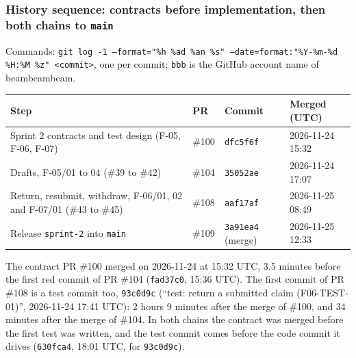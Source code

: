 \subsubsection*{History sequence: contracts before implementation, then both chains to \texttt{main}}

Commands: \texttt{git log -1 --format="\%h  \%ad  \%an  \%s" --date=format:"\%Y-\%m-\%d \%H:\%M \%z" <commit>}, one per commit; \texttt{bbb} is the GitHub account name of beambeambeam.


\begin{center}\small
\begin{tabular}{@{}p{7.2cm}lll@{}}
\toprule \textbf{Step} & \textbf{PR} & \textbf{Commit} & \textbf{Merged (UTC)} \\ \midrule
Sprint 2 contracts and test design (F-05, F-06, F-07) & \#100 & \texttt{dfc5f6f} & 2026-11-24 15:32 \\
Drafts, F-05/01 to 04 (\#39 to \#42) & \#104 & \texttt{35052ae} & 2026-11-24 17:07 \\
Return, resubmit, withdraw, F-06/01, 02 and F-07/01 (\#43 to \#45) & \#108 & \texttt{aaf17af} & 2026-11-25 08:49 \\
Release \texttt{sprint-2} into \texttt{main} & \#109 & \texttt{3a91ea4} (merge) & 2026-11-25 12:33 \\
\bottomrule
\end{tabular}
\end{center}

The contract PR \#100 merged on 2026-11-24 at 15:32 UTC, 3.5 minutes before the first red commit of PR \#104 (\texttt{fad37c0}, 15:36 UTC). The first commit of PR \#108 is a test commit too, \texttt{93c0d9c} (``test: return a submitted claim (F06-TEST-01)'', 2026-11-24 17:41 UTC): 2 hours 9 minutes after the merge of \#100, and 34 minutes after the merge of \#104. In both chains the contract was merged before the first test was written, and the test commit comes before the code commit it drives (\texttt{630fca4}, 18:01 UTC, for \texttt{93c0d9c}).

